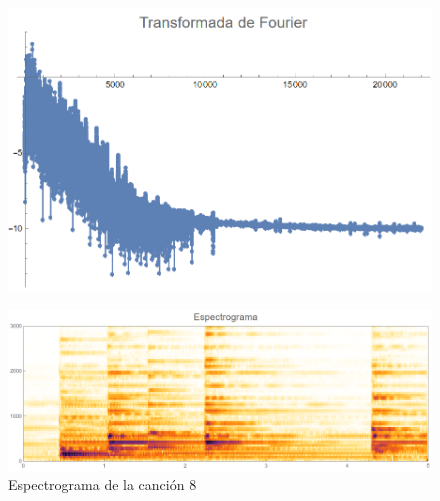 \documentclass[12pt, letterpaper]{article}
\begin{document}
\begin{figure}[H]
  \centering
  \begin{minipage}{.4\linewidth}
    \centering
    \includegraphics[width=\linewidth]{imgs/Cancion8/transformada.png}
    \label{fig:08a}
  \end{minipage}
  \begin{minipage}{0.07\textwidth}\end{minipage}
  \begin{minipage}{.47\linewidth}
    \centering
    \includegraphics[width=\linewidth]{imgs/Cancion8/espectrograma.png}
    \caption{Espectrograma de la canción 8}
    \label{fig:08i}
  \end{minipage}
\end{figure}
\end{document}
